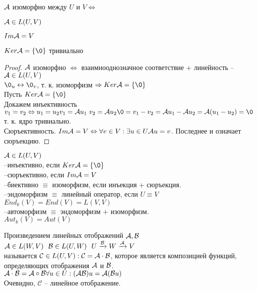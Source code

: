 \documentclass[../spring.tex]{subfiles}
\begin{document}
	\begin{stat}
		$\mathcal{A}$ изоморфно между $U$ и $V \Leftrightarrow$ 
		\begin{mylist}
			\item $\mathcal{A} \in L(U, V)$
			\item $Im\mathcal{A} = V$
			\item $Ker\A = \{\0\}$ тривиально 
		\end{mylist}
	\end{stat}
	\begin{proof}
		$\mathcal{A}$ изоморфно $\Leftrightarrow$ взаимнооднозначное соответствие + линейность -- $\mathcal{A}\in L(U, V)$\\
		$\0_u \leftrightarrow \0_v$, т. к. изоморфизм $\Rightarrow Ker\A = \{\0\}$\\
		Пусть $Ker\A = \{\0\}$\\
		Докажем инъективность $v_1 = v_2 \Leftrightarrow u_1 = u_2\\
		v_1 = \A u_1 \ v_2 = \A u_2\\
		\0 = v_1-v_2 = \A u_1 - \A u_2 = \A(u_1 - u_2) = \0$ т. к. ядро тривиально.\\
		Сюръективность. $Im\mathcal{A} = V \Leftrightarrow \forall v \in V: \exists u \in U \mathcal{A} u = v$. Последнее и означает сюръекцию.
	\end{proof}
	\begin{defin}
		$\mathcal{A} \in L(U, V)$\\
		--инъективно, если $Ker\A = \{\0 \}$\\
		--сюръективно, если $Im \mathcal{A} = V$\\
		--биективно $\equiv$ изоморфизм, если инъекция + сюръекция.\\
		--эндоморфизм $\equiv$ линейный оператор, если $U \equiv V$\\
		$End_k(V) = End(V) = L(V, V)$\\
		--автоморфизм $\equiv$ эндоморфизм + изоморфизм. \\
		$Aut_k(V) = Aut(V)$
	\end{defin}
	\begin{defin}
		Произведением линейных отображений $\mathcal{A}, \mathcal{B}$ \\
		$\mathcal{A} \in L(W, V) \ \  \mathcal{B} \in L(U, W) \ \
		U \xrightarrow{\mathcal{B}} W \xrightarrow{\mathcal{A}} V$\\
		называется $\mathcal{C} \in L(U, V) : \mathcal{C} = \mathcal{A}\cdot \mathcal{B}$, которое является композицией функций, определяющих отображения $\mathcal{A}$ и $\mathcal{B}$.\\
		$\mathcal{A}\cdot \mathcal{B} = \mathcal{A} \circ \mathcal{B}\\
		\forall u \in U: (\mathcal{A} \mathcal{B})u = \mathcal{A}(\mathcal{B} u)$\\
		Очевидно, $\mathcal{C}$ -- линейное отображение.
	\end{defin}
\end{document}
